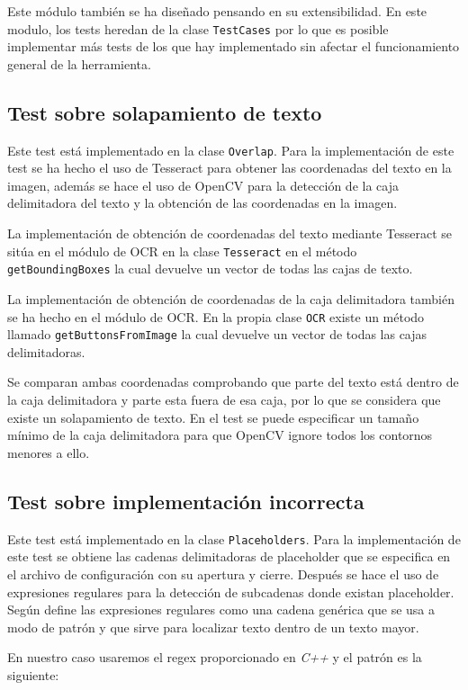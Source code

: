 Este módulo también se ha diseñado pensando en su extensibilidad.
En este modulo, los tests heredan de la clase \texttt{TestCases} por lo que es posible implementar más tests de los que hay implementado sin afectar el funcionamiento general de la herramienta.
\subsection{Test sobre solapamiento de texto}
\label{itest:overlap}
Este test está implementado en la clase \texttt{Overlap}.
Para la implementación de este test se ha hecho el uso de Tesseract para obtener las coordenadas del texto en la imagen, además se hace el uso de OpenCV para la detección de la caja delimitadora del texto y la obtención de las coordenadas en la imagen.

La implementación de obtención de coordenadas del texto mediante Tesseract se sitúa en el módulo de OCR en la clase \texttt{Tesseract} en el método \texttt{getBoundingBoxes} la cual devuelve un vector de todas las cajas de texto.

La implementación de obtención de coordenadas de la caja delimitadora también se ha hecho en el módulo de OCR. En la propia clase \texttt{OCR} existe un método llamado \texttt{getButtonsFromImage} la cual devuelve un vector de todas las cajas delimitadoras.

Se comparan ambas coordenadas comprobando que parte del texto está dentro de la caja delimitadora y parte esta fuera de esa caja, por lo que se considera que existe un solapamiento de texto. En el test se puede especificar un tamaño mínimo de la caja delimitadora para que OpenCV ignore todos los contornos menores a ello. 
\subsection{Test sobre implementación incorrecta}
\label{itest:placeholder}
Este test está implementado en la clase \texttt{Placeholders}.
Para la implementación de este test se obtiene las cadenas delimitadoras de placeholder que se especifica en el archivo de configuración con su apertura y cierre. Después se hace el uso de expresiones regulares para la detección de subcadenas donde existan placeholder. Según \cite{Regex} define las expresiones regulares como una cadena genérica que se usa a modo de patrón y que sirve para localizar texto dentro de un texto mayor. 

En nuestro caso usaremos el regex proporcionado en \emph{C++} y el patrón es la siguiente:


